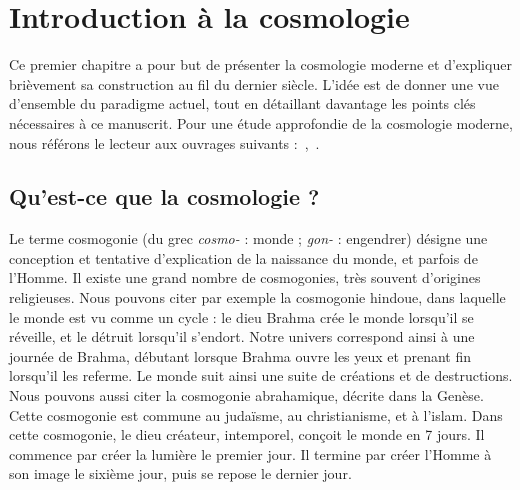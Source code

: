 \documentclass[11pt, twoside, a4paper, openright]{report}
\begin{document}

\graphicspath{ {../figures/intro/} }

\chapter{Introduction à la cosmologie}
\minitoc
\newpage
\thispagestyle{fancy}
Ce premier chapitre a pour but de présenter la cosmologie moderne et d'expliquer brièvement sa construction au fil du dernier siècle. L'idée est de donner une vue d'ensemble du paradigme actuel, tout en détaillant davantage les points clés nécessaires à ce manuscrit. Pour une étude approfondie de la cosmologie moderne, nous référons le lecteur aux ouvrages suivants :~\textcite{Rich2010},~\textcite{Dodelson2003}. 

\section{Qu'est-ce que la cosmologie ?}
Le terme cosmogonie (du grec \emph{cosmo-} : monde ; \emph{gon-} : engendrer) désigne une conception et tentative d'explication de la naissance du monde, et parfois de l'Homme. Il existe une grand nombre de cosmogonies, très souvent d'origines religieuses. Nous pouvons citer par exemple la cosmogonie hindoue, dans laquelle le monde est vu comme un cycle : le dieu Brahma crée le monde lorsqu'il se réveille, et le détruit lorsqu'il s'endort. Notre univers correspond ainsi à une journée de Brahma, débutant lorsque Brahma ouvre les yeux et prenant fin lorsqu'il les referme. Le monde suit ainsi une suite de créations et de destructions.
Nous pouvons aussi citer la cosmogonie abrahamique, décrite dans la Genèse. Cette cosmogonie est commune au judaïsme, au christianisme, et à l'islam. Dans cette cosmogonie, le dieu créateur, intemporel, conçoit le monde en 7 jours. Il commence par créer la lumière le premier jour. Il termine par créer l'Homme à son image le sixième jour, puis se repose le dernier jour.
\end{document}

